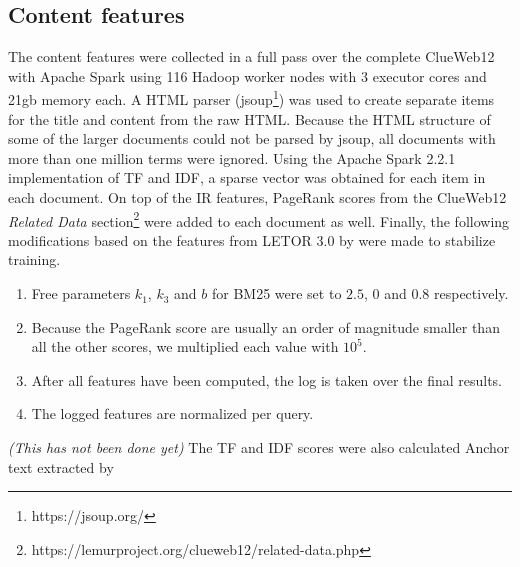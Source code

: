 \subsection{Content features} \label{sec:contentfeature}
The content features were collected in a full pass over the complete ClueWeb12 with Apache Spark using 116 Hadoop worker nodes with 3 executor cores and 21gb memory each. A HTML parser (jsoup\footnote{https://jsoup.org/}) was used to create separate items for the title and content from the raw HTML. Because the HTML structure of some of the larger documents could not be parsed by jsoup, all documents with more than one million terms were ignored. Using the Apache Spark 2.2.1 implementation of TF and IDF, a sparse vector was obtained for each item in each document.  On top of the IR features, PageRank scores from the ClueWeb12 \textit{Related Data} section\footnote{https://lemurproject.org/clueweb12/related-data.php} were added to each document as well. Finally, the following modifications based on the features from LETOR 3.0 by \citet{qin2010letor} were made to stabilize training.
\begin{enumerate}  
\item Free parameters $k_1$, $k_3$ and $b$ for BM25 were set to $2.5$, $0$ and $0.8$ respectively. 
\item Because the PageRank score are usually an order of magnitude smaller than all the other scores, we multiplied each value with $10^5$.
\item After all features have been computed, the log is taken over the final results.
\item The logged features are normalized per query.  
\end{enumerate}



\textit{(This has not been done yet)} The TF and IDF scores were also calculated Anchor text extracted by \citet{hiemstra2010mapreduce} 

